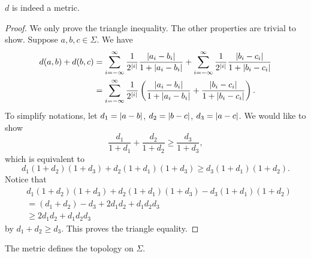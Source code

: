 \documentclass[12pt,twoside]{book}
\begin{document}
\begin{proposition}
  $d$ is indeed a metric.
  \label{prop:symb-metric}
  \begin{proof}
    We only prove the triangle inequality.
    The other properties are trivial to show.
    Suppose $a,b,c \in \Sigma$.
    We have
    \begin{align*}
      d(a,b) + d(b,c)
      &= \sum\limits_{i = -\infty}^{\infty} \frac{1}{2^{\left | i \right |}} \frac{\left | a_i - b_i \right |}{1 + \left | a_i - b_i \right |}
        +
        \sum\limits_{i = -\infty}^{\infty} \frac{1}{2^{\left | i \right |}} \frac{\left | b_i - c_i \right |}{1 + \left | b_i - c_i \right |}   \\
      &= \sum\limits_{i = -\infty}^{\infty} \frac{1}{2^{\left | i \right |}} \left (  \frac{\left | a_i - b_i \right |}{1 + \left | a_i - b_i \right |} + \frac{\left | b_i - c_i \right |}{1 + \left | b_i - c_i \right |}  \right ).
    \end{align*}
    To simplify notations, let $d_1 = \left | a - b \right |$, $d_2 = \left | b - c \right |$, $d_3 = \left | a - c \right |$.
    We would like to show
    \begin{equation*}
      \frac{d_1}{1 + d_1} + \frac{d_2}{1 + d_2} \geq \frac{d_3}{1 + d_3},
    \end{equation*}
    which is equivalent to
    \begin{equation*}
      d_1(1+d_2)(1+d_3) + d_2(1+d_1)(1+d_3) \geq  d_3(1+d_1)(1+d_2).
    \end{equation*}
    Notice that
    \begin{align*}
      &d_1(1+d_2)(1+d_3) + d_2(1+d_1)(1+d_3) - d_3(1+d_1)(1+d_2)  \\
      &= (d_1 + d_2) - d_3 + 2d_1d_2 + d_1d_2d_3  \\
      &\geq 2d_1d_2 + d_1d_2d_3
    \end{align*}
    by $d_1 + d_2 \geq d_3$.
    This proves the triangle equality.
 \end{proof}
\end{proposition}
The metric defines the topology on $\Sigma$.
\end{document}
